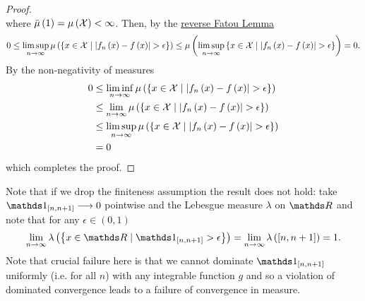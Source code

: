 \begin{proof}
\[\]
where $\bar{\mu}\left(1\right)=\mu\left(\mathcal{X}\right)<\infty$. Then, by the \hyperref[cor:reverseFatouLemma]{reverse Fatou Lemma}
\[
0\leq\limsup_{n\to\infty}\mu\left(\left\{ x\in\mathcal{X}\mid\lvert f_{n}\left(x\right)-f\left(x\right)\rvert>\epsilon\right\} \right)\leq\mu\left(\limsup_{n\to\infty}\left\{ x\in\mathcal{X}\mid\lvert f_{n}\left(x\right)-f\left(x\right)\rvert>\epsilon\right\} \right)=0.
\]
By the non-negativity of measures
\begin{align*}
0 & \leq\liminf_{n\to\infty}\mu\left(\left\{ x\in\mathcal{X}\mid\lvert f_{n}\left(x\right)-f\left(x\right)\rvert>\epsilon\right\} \right)\\
 & \leq\lim_{n\to\infty}\mu\left(\left\{ x\in\mathcal{X}\mid\lvert f_{n}\left(x\right)-f\left(x\right)\rvert>\epsilon\right\} \right)\\
 & \leq\limsup_{n\to\infty}\mu\left(\left\{ x\in\mathcal{X}\mid\lvert f_{n}\left(x\right)-f\left(x\right)\rvert>\epsilon\right\} \right)\\
 & =0
\end{align*}
which completes the proof.
\end{proof}
Note that if we drop the finiteness assumption the result does not
hold: take $\indicate_{[n,n+1]}\longrightarrow0$ pointwise and the
Lebesgue measure $\lambda$ on $\R$ and note that for any $\epsilon\in\left(0,1\right)$
\[
\lim_{n\to\infty}\lambda\left(\left\{ x\in\R\mid\indicate_{[n,n+1]}>\epsilon\right\} \right)=\lim_{n\to\infty}\lambda\left(\left[n,n+1\right]\right)=1.
\]
Note that crucial failure here is that we cannot dominate $\indicate_{[n,n+1]}$
uniformly (i.e. for all $n$) with any integrable function $g$ and
so a violation of dominated convergence leads to a failure of convergence
in measure.

